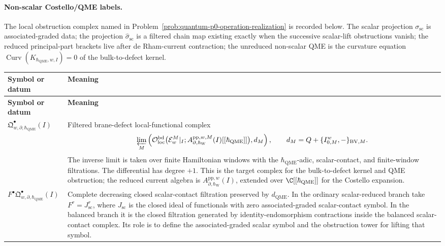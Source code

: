 \paragraph{Non-scalar Costello/QME labels.}
The local obstruction complex named in
Problem~\ref{prob:quantum-p0-operation-realization} is recorded
below.  The scalar
projection \(\sigma_{\mathrm{sc}}\) is associated-graded data; the
projection \(\widehat\sigma_{\mathrm{sc}}\) is a filtered chain map
existing exactly when the successive scalar-lift obstructions vanish;
the reduced principal-part brackets live after de Rham-current
contraction; the unreduced non-scalar QME is the curvature equation
\(\operatorname{Curv}(K_{\hbar_{\mathrm{QME}},w,I})=0\) of the bulk-to-defect kernel.
\begin{longtable}{@{}>{\raggedright\arraybackslash}p{}
  >{\raggedright\arraybackslash}p{}@{}}
\hline
\textbf{Symbol or datum} & \textbf{Meaning}\\
\hline
\endfirsthead
\hline
\textbf{Symbol or datum} & \textbf{Meaning}\\
\hline
\endhead
\(\mathfrak Q^\bullet_{w,\partial,\hbar_{\mathrm{QME}}}(I)\) &
Filtered brane-defect local-functional complex
\[
	  \varprojlim_M
	  \left(
	    \mathcal O_{\mathrm{loc}}^{\mathrm{bd}}\bigl(
	      \mathcal E_w^M|_I;
	      A_{\partial,\hbar_{\mathrm{W}}}^{\mathrm{pp},w,M}(I)
	      [[\hbar_{\mathrm{QME}}]]\bigr),
	    d_M
	  \right),
	  \qquad d_M=Q+\{I^w_{0,M},-\}_{\mathrm{BV},M}.
\]
The inverse limit is taken over finite Hamiltonian windows with the
\(\hbar_{\mathrm{QME}}\)-adic, scalar-contact, and finite-window filtrations.  The
		differential has degree \(+1\).  This is the target complex for the
		bulk-to-defect kernel and QME obstruction; the reduced current algebra is
		\(A_{\partial,\hbar_{\mathrm{W}}}^{\mathrm{pp},w}(I)\), extended over
		\(\C[[\hbar_{\mathrm{QME}}]]\) for the Costello expansion.\\
\hline
\(F^\bullet\mathfrak Q^\bullet_{w,\partial,\hbar_{\mathrm{QME}}}(I)\) &
Complete decreasing closed scalar-contact filtration preserved by
\(d_{\mathrm{QME}}\).  In the ordinary scalar-reduced branch take
\(F^r=J_{\mathrm{sc}}^r\), where \(J_{\mathrm{sc}}\) is the closed ideal
of functionals with zero associated-graded scalar-contact symbol.  In the
balanced branch it is the closed filtration generated by
identity-endomorphism contractions inside the balanced scalar-contact
complex.  Its role is to define the associated-graded scalar symbol and
the obstruction tower for lifting that symbol.\\

\end{longtable}
